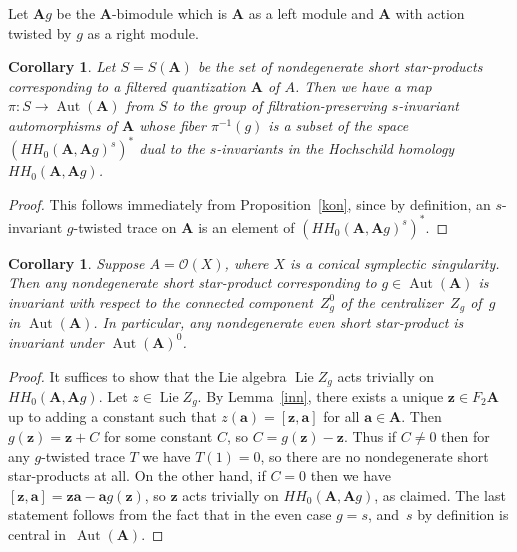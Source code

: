 \documentclass[11pt]{article}
\numberwithin{equation}{section}
\numberwithin{equation}{section}
\newtheorem{Corollary}[Theorem]{Corollary}
\begin{document}
Let ${\mathbf A}g$ be the ${\mathbf A}$-bimodule which is ${\mathbf A}$ as a left module and ${\mathbf A}$ with action twisted by $g$ as a right module.

\begin{Corollary}\label{bun} Let $S=S({\mathbf A})$ be the set of nondegenerate short star-products corresponding to a filtered quantization ${{\mathbf A}}$ of $A$. Then we have a map $\pi\colon S\to \operatorname{Aut}({{\mathbf A}})$ from $S$ to the group of filtration-preserving $s$-invariant automorphisms of ${{\mathbf A}}$ whose fiber $\pi^{-1}(g)$ is a subset of the space $(HH_0({{\mathbf A}},{{\mathbf A}}g)^s)^*$ dual to the $s$-invariants in the Hochschild homology $HH_0({{\mathbf A}},{{\mathbf A}}g)$.
\end{Corollary}

\begin{proof} This follows immediately from Proposition~\ref{kon}, since by definition, an $s$-invariant $g$-twisted trace on ${{\mathbf A}}$ is an element of $(HH_0({{\mathbf A}},{{\mathbf A}}g)^s)^*$.
\end{proof}

\begin{Corollary} \label{bun1} Suppose $A=\mathcal{O}(X)$, where $X$ is a conical symplectic
singularity. Then any nondegenerate short star-product corresponding to $g\in \operatorname{Aut}({{\mathbf A}})$
is invariant with respect to the connected component~$Z_g^0$ of the centralizer~$Z_g$
of~$g$ in $\operatorname{Aut}({{\mathbf A}})$. In particular, any nondegenerate even short star-product
is invariant under $\operatorname{Aut}({\mathbf A})^0$.
\end{Corollary}

\begin{proof} It suffices to show that the Lie algebra $\operatorname{Lie}Z_g$ acts trivially on
$HH_0({\mathbf A},{\mathbf A} g)$. Let $z\in \operatorname{Lie}Z_g$. By Lemma~\ref{inn}, there exists a unique ${\mathbf z}\in F_2{\mathbf A}$ up to adding a constant such that $z({\mathbf a})=[{\mathbf z},{\mathbf a}]$ for all ${\mathbf a}\in {\mathbf A}$. Then $g({\mathbf z})={\mathbf z}+C$ for some constant $C$, so $C=g({\mathbf z})-{\mathbf z}$. Thus if $C\ne 0$ then for any $g$-twisted trace $T$ we have $T(1)=0$, so there are no nondegenerate short star-products at all. On the other hand, if $C=0$ then we have $[{\mathbf z},{\mathbf a}]={\mathbf z}{\mathbf a}-{\mathbf a}g({\mathbf z})$, so ${\mathbf z}$ acts trivially on $HH_0({\mathbf A},{\mathbf A} g)$, as claimed. The last statement follows from the fact that in the even case $g=s$, and~$s$ by definition is central in~$\operatorname{Aut}({{\mathbf A}})$.
\end{proof}
\end{document}
